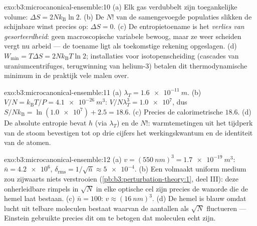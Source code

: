 \begin{solution}{exo:b3:microcanonical-ensemble:10}
(a) Elk gas verdubbelt zijn toegankelijke volume: $\Delta S =
2Nk_{\text{B}}\ln2$. (b) De $N!$ van de samengevoegde populaties slikken de
schijnbare winst precies op: $\Delta S = 0$. (c) De entropietoename is het
\emph{verlies van gesorteerdheid}: geen macroscopische variabele bewoog,
maar ze weer scheiden vergt nu arbeid --- de toename ligt als toekomstige
rekening opgeslagen. (d) $W_{\min} = T\Delta S =
2Nk_{\text{B}}T\ln2$;
installaties voor isotopenscheiding (cascades van uraniumcentrifuges,
terugwinning van helium-3) betalen dit thermodynamische minimum in de
praktijk vele malen over.
\end{solution}

\begin{solution}{exo:b3:microcanonical-ensemble:11}
(a) $\lambda_T = \qty{1.6e-11}{m}$. (b) $V/N = k_{\text{B}}T/P =
\qty{4.1e-26}{m^3}$: $V/N\lambda_T^3 = \num{1.0e7}$, dus
$S/Nk_{\text{B}} = \ln(\num{1.0e7}) + 2.5 = 18.6$. (c) Precies de
calorimetrische $18.6$. (d) De absolute entropie bevat $h$ (via
$\lambda_T$) en de $N!$: warmtemetingen uit het tijdperk van de stoom
bevestigen tot op drie cijfers het werkingskwantum en de identiteit van de
atomen.
\end{solution}

\begin{solution}{exo:b3:microcanonical-ensemble:12}
(a) $v = (\qty{550}{nm})^3 = \qty{1.7e-19}{m^3}$: $\bar n =
\num{4.2e6}$, $\delta_{\text{rms}} = 1/\sqrt{\bar n} \approx
\num{5e-4}$. (b) Een volmaakt uniform medium zou zijwaarts niets
verstrooien (\cref{pb:b3:perturbation-theory:1}, deel III): deze
onherleidbare rimpels in $\sqrt N$ in elke optische cel zijn precies de
wanorde die de hemel laat bestaan. (c) $\bar n = 100$: $v
\approx (\qty{16}{nm})^3$. (d) De hemel is blauw omdat lucht uit telbare moleculen
bestaat waarvan de aantallen als $\sqrt N$ fluctueren --- Einstein
gebruikte precies dit om te betogen dat moleculen echt zijn.
\end{solution}

